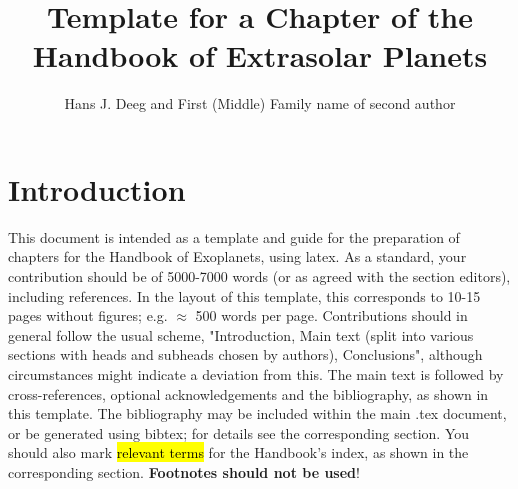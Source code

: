 \documentclass[graybox,natbib,nosecnum]{svmult}
\newcommand{\hbindex}[1]{\hl{#1}\index{#1}}  %
\begin{document}
\title*{Template for a Chapter of the Handbook of Extrasolar Planets}
\author{Hans J. Deeg  and First (Middle) Family name of second author}
%
%
\maketitle



\section{Introduction }
This document is intended as a template and guide for the preparation of chapters for the Handbook of Exoplanets, using latex. As a standard, your contribution should be of 5000-7000 words (or as agreed with the section editors), including references. In the layout of this template, this corresponds to  10-15 pages without figures; e.g. $\approx$ 500 words per page. Contributions should in general follow the usual scheme, "Introduction, Main text (split into various sections with heads and subheads chosen by authors), Conclusions", although circumstances might indicate a deviation from this. The main text is followed by cross-references, optional acknowledgements and the bibliography, as shown in this template. The bibliography may be included within the main .tex document, or be generated using bibtex; for details see the corresponding section. You should also mark \hbindex{relevant terms} for the Handbook's index, as shown in the corresponding section.
{\bf Footnotes should not be used}!
\end{document}
